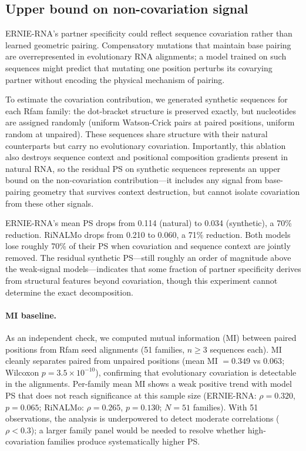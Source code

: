 \documentclass[11pt]{article}
\begin{document}
\subsection{Upper bound on non-covariation signal}

ERNIE-RNA's partner specificity could reflect sequence covariation
rather than learned geometric pairing. Compensatory mutations that
maintain base pairing are overrepresented in evolutionary RNA
alignments; a model trained on such sequences might predict that
mutating one position perturbs its covarying partner without encoding
the physical mechanism of pairing.

To estimate the covariation contribution, we generated synthetic
sequences for each Rfam family: the dot-bracket structure is
preserved exactly, but nucleotides are assigned randomly (uniform
Watson-Crick pairs at paired positions, uniform random at unpaired).
These sequences share structure with their natural counterparts but
carry no evolutionary covariation. Importantly, this ablation also
destroys sequence context and positional composition gradients
present in natural RNA, so the residual PS on synthetic sequences
represents an upper bound on the non-covariation contribution---it
includes any signal from base-pairing geometry that survives context
destruction, but cannot isolate covariation from these other signals.

ERNIE-RNA's mean PS drops from 0.114 (natural) to 0.034 (synthetic),
a 70\% reduction. RiNALMo drops from 0.210 to 0.060, a 71\%
reduction. Both models lose roughly 70\% of their PS when covariation
and sequence context are jointly removed. The residual synthetic
PS---still roughly an order of magnitude above the weak-signal
models---indicates that some fraction of partner specificity
derives from structural features beyond covariation, though this
experiment cannot determine the exact decomposition.

\paragraph{MI baseline.}
As an independent check, we computed mutual information (MI) between
paired positions from Rfam seed alignments (51 families, $n \geq 3$
sequences each). MI cleanly separates paired from unpaired positions
(mean MI $= 0.349$ vs $0.063$; Wilcoxon $p = 3.5 \times 10^{-10}$),
confirming that evolutionary covariation is detectable in the
alignments. Per-family mean MI shows a weak positive trend with
model PS that does not reach significance at this sample size
(ERNIE-RNA: $\rho = 0.320$, $p = 0.065$; RiNALMo:
$\rho = 0.265$, $p = 0.130$; $N = 51$ families). With 51
observations, the analysis is underpowered to detect moderate
correlations ($\rho < 0.3$); a larger family panel would be
needed to resolve whether high-covariation families produce
systematically higher PS.
\end{document}
